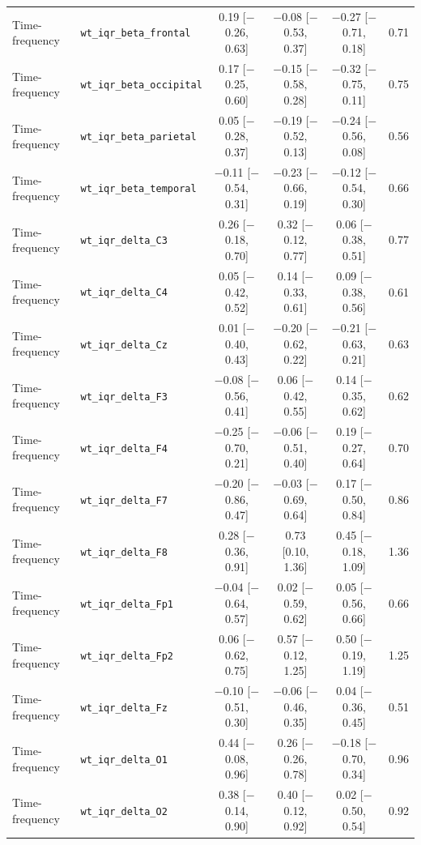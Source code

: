 {\begin{longtable}{llcccc}
Time-frequency & \texttt{wt\_iqr\_beta\_frontal} & 0.19 [$-$0.26, 0.63] & $-$0.08 [$-$0.53, 0.37] & $-$0.27 [$-$0.71, 0.18] & 0.71 \\
Time-frequency & \texttt{wt\_iqr\_beta\_occipital} & 0.17 [$-$0.25, 0.60] & $-$0.15 [$-$0.58, 0.28] & $-$0.32 [$-$0.75, 0.11] & 0.75 \\
Time-frequency & \texttt{wt\_iqr\_beta\_parietal} & 0.05 [$-$0.28, 0.37] & $-$0.19 [$-$0.52, 0.13] & $-$0.24 [$-$0.56, 0.08] & 0.56 \\
Time-frequency & \texttt{wt\_iqr\_beta\_temporal} & $-$0.11 [$-$0.54, 0.31] & $-$0.23 [$-$0.66, 0.19] & $-$0.12 [$-$0.54, 0.30] & 0.66 \\
Time-frequency & \texttt{wt\_iqr\_delta\_C3} & 0.26 [$-$0.18, 0.70] & 0.32 [$-$0.12, 0.77] & 0.06 [$-$0.38, 0.51] & 0.77 \\
Time-frequency & \texttt{wt\_iqr\_delta\_C4} & 0.05 [$-$0.42, 0.52] & 0.14 [$-$0.33, 0.61] & 0.09 [$-$0.38, 0.56] & 0.61 \\
Time-frequency & \texttt{wt\_iqr\_delta\_Cz} & 0.01 [$-$0.40, 0.43] & $-$0.20 [$-$0.62, 0.22] & $-$0.21 [$-$0.63, 0.21] & 0.63 \\
Time-frequency & \texttt{wt\_iqr\_delta\_F3} & $-$0.08 [$-$0.56, 0.41] & 0.06 [$-$0.42, 0.55] & 0.14 [$-$0.35, 0.62] & 0.62 \\
Time-frequency & \texttt{wt\_iqr\_delta\_F4} & $-$0.25 [$-$0.70, 0.21] & $-$0.06 [$-$0.51, 0.40] & 0.19 [$-$0.27, 0.64] & 0.70 \\
Time-frequency & \texttt{wt\_iqr\_delta\_F7} & $-$0.20 [$-$0.86, 0.47] & $-$0.03 [$-$0.69, 0.64] & 0.17 [$-$0.50, 0.84] & 0.86 \\
Time-frequency & \texttt{wt\_iqr\_delta\_F8} & 0.28 [$-$0.36, 0.91] & 0.73 [0.10, 1.36] & 0.45 [$-$0.18, 1.09] & 1.36 \\
Time-frequency & \texttt{wt\_iqr\_delta\_Fp1} & $-$0.04 [$-$0.64, 0.57] & 0.02 [$-$0.59, 0.62] & 0.05 [$-$0.56, 0.66] & 0.66 \\
Time-frequency & \texttt{wt\_iqr\_delta\_Fp2} & 0.06 [$-$0.62, 0.75] & 0.57 [$-$0.12, 1.25] & 0.50 [$-$0.19, 1.19] & 1.25 \\
Time-frequency & \texttt{wt\_iqr\_delta\_Fz} & $-$0.10 [$-$0.51, 0.30] & $-$0.06 [$-$0.46, 0.35] & 0.04 [$-$0.36, 0.45] & 0.51 \\
Time-frequency & \texttt{wt\_iqr\_delta\_O1} & 0.44 [$-$0.08, 0.96] & 0.26 [$-$0.26, 0.78] & $-$0.18 [$-$0.70, 0.34] & 0.96 \\
Time-frequency & \texttt{wt\_iqr\_delta\_O2} & 0.38 [$-$0.14, 0.90] & 0.40 [$-$0.12, 0.92] & 0.02 [$-$0.50, 0.54] & 0.92 \\

\end{longtable}}
